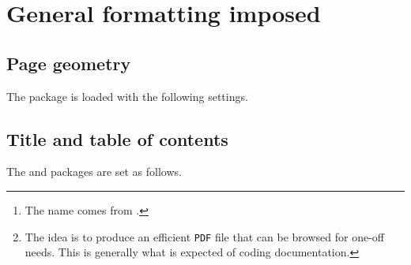 \begin{abstract}
    The \thispack{} package
    \footnote{
        The name comes from .
    }
    is used by its author to semantically produce documentation of \LaTeX\ packages and classes in a tutorial style
    \footnote{
        The idea is to produce an efficient \texttt{PDF} file that can be browsed for one-off needs. This is generally what is expected of coding documentation.
    },
    and with a sober rendering for reading on screen.

    \medskip

    Two important points to note.
    \begin{itemize}
        \item This package imposes a formatting style. In the not-too-distant future, \thispack{} will probably be split into a class and a package.

        \item This documentation is also available in French.
    \end{itemize}
\end{abstract}


\newpage
\tableofcontents
\newpage


\section{General formatting imposed}

\subsection{Page geometry}

The  package is loaded with the following settings.


\begin{tdoclatex}[code]
\RequirePackage[
  top            = 2.5cm,
  bottom         = 2.5cm,
  left           = 2.5cm,
  right          = 2.5cm,
  marginparwidth = 2cm,
  marginparsep   = 2mm,
  heightrounded
]{geometry}
\end{tdoclatex}


\subsection{Title and table of contents}

The  and  packages are set as follows.


